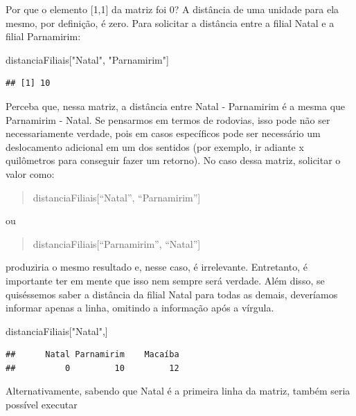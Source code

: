 \documentclass[
]{book}
\newenvironment{Shaded}{\begin{snugshade}}{\end{snugshade}}
\newcommand{\NormalTok}[1]{#1}
\newcommand{\StringTok}[1]{\textcolor[rgb]{0.31,0.60,0.02}{#1}}
\begin{document}
Por que o elemento {[}1,1{]} da matriz foi 0? A distância de uma unidade para ela mesmo, por definição, é zero. Para solicitar a distância entre a filial Natal e a filial Parnamirim:

\begin{Shaded}
\begin{Highlighting}[]
\NormalTok{distanciaFiliais[}\StringTok{"Natal"}\NormalTok{, }\StringTok{"Parnamirim"}\NormalTok{]}
\end{Highlighting}
\end{Shaded}

\begin{verbatim}
## [1] 10
\end{verbatim}

Perceba que, nessa matriz, a distância entre Natal - Parnamirim é a mesma que Parnamirim - Natal. Se pensarmos em termos de rodovias, isso pode não ser necessariamente verdade, pois em casos específicos pode ser necessário um deslocamento adicional em um dos sentidos (por exemplo, ir adiante x quilômetros para conseguir fazer um retorno). No caso dessa matriz, solicitar o valor como:

\begin{quote}
distanciaFiliais{[}``Natal'', ``Parnamirim''{]}
\end{quote}

ou

\begin{quote}
distanciaFiliais{[}``Parnamirim'', ``Natal''{]}
\end{quote}

produziria o mesmo resultado e, nesse caso, é irrelevante. Entretanto, é importante ter em mente que isso nem sempre será verdade. Além disso, se quiséssemos saber a distância da filial Natal para todas as demais, deveríamos informar apenas a linha, omitindo a informação após a vírgula.

\begin{Shaded}
\begin{Highlighting}[]
\NormalTok{distanciaFiliais[}\StringTok{"Natal"}\NormalTok{,]}
\end{Highlighting}
\end{Shaded}

\begin{verbatim}
##      Natal Parnamirim    Macaíba 
##          0         10         12
\end{verbatim}

Alternativamente, sabendo que Natal é a primeira linha da matriz, também seria possível executar
\end{document}
